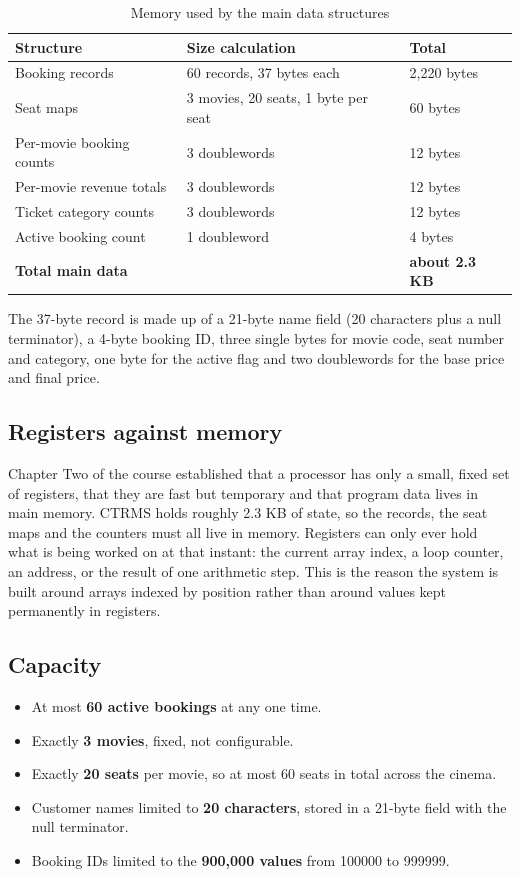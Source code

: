\documentclass{thesis-library}
\newcommand{\tablefont}{\footnotesize\setstretch{1.15}\hyphenpenalty=10000\relax}
\begin{document}
\begin{table}[H]
\centering
\tablefont
\caption{Memory used by the main data structures}
\label{tab:memory}
\begin{tabular}{|l|l|l|}
\hline
\textbf{Structure} & \textbf{Size calculation} & \textbf{Total} \\
\hline
Booking records & 60 records, 37 bytes each & 2,220 bytes \\
\hline
Seat maps & 3 movies, 20 seats, 1 byte per seat & 60 bytes \\
\hline
Per-movie booking counts & 3 doublewords & 12 bytes \\
\hline
Per-movie revenue totals & 3 doublewords & 12 bytes \\
\hline
Ticket category counts & 3 doublewords & 12 bytes \\
\hline
Active booking count & 1 doubleword & 4 bytes \\
\hline
\textbf{Total main data} & & \textbf{about 2.3 KB} \\
\hline
\end{tabular}
\end{table}

The 37-byte record is made up of a 21-byte name field (20 characters plus a null terminator), a 4-byte booking ID, three single bytes for movie code, seat number and category, one byte for the active flag and two doublewords for the base price and final price.

\subsection{Registers against memory}

Chapter Two of the course established that a processor has only a small, fixed set of registers, that they are fast but temporary and that program data lives in main memory. CTRMS holds roughly 2.3 KB of state, so the records, the seat maps and the counters must all live in memory. Registers can only ever hold what is being worked on at that instant: the current array index, a loop counter, an address, or the result of one arithmetic step. This is the reason the system is built around arrays indexed by position rather than around values kept permanently in registers.

\subsection{Capacity}

\begin{itemize}
\item At most \textbf{60 active bookings} at any one time.
\item Exactly \textbf{3 movies}, fixed, not configurable.
\item Exactly \textbf{20 seats} per movie, so at most 60 seats in total across the cinema.
\item Customer names limited to \textbf{20 characters}, stored in a 21-byte field with the null terminator.
\item Booking IDs limited to the \textbf{900,000 values} from 100000 to 999999.
\end{itemize}
\end{document}
